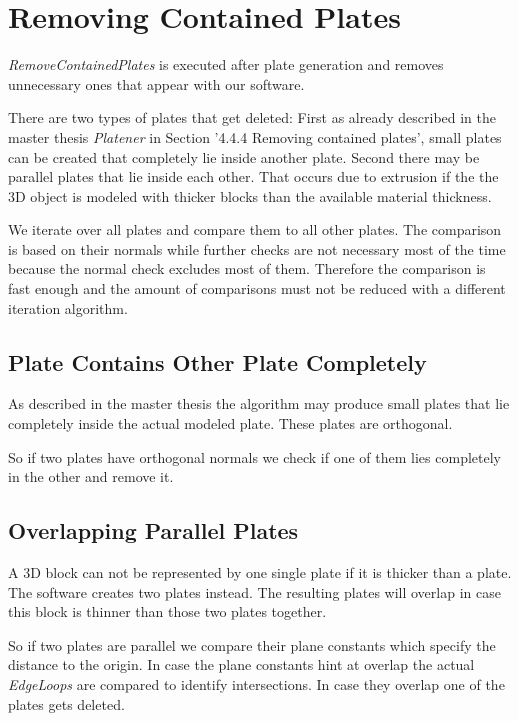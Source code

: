 \documentclass[../ClassicThesis.tex]{subfiles}
\begin{document}
\section{Removing Contained Plates}\label{sec:removingContainedPlates}

\emph{RemoveContainedPlates} is executed after plate generation and removes unnecessary ones that appear with our software.

There are two types of plates that get deleted: First as already described in the master thesis \emph{Platener} \cite{master-thesis} in Section '4.4.4 Removing contained plates', small plates can be created that completely lie inside another plate. Second there may be parallel plates that lie inside each other. That occurs due to extrusion if the the 3D object is modeled with thicker blocks than the available material thickness.

We iterate over all plates and compare them to all other plates. The comparison is based on their normals while further checks are not necessary most of the time because the normal check excludes most of them. Therefore the comparison is fast enough and the amount of comparisons must not be reduced with a different iteration algorithm.

\subsection{Plate Contains Other Plate Completely}

As described in the master thesis the algorithm may produce small plates that lie completely inside the actual modeled plate. These plates are orthogonal.

So if two plates have orthogonal normals we check if one of them lies completely in the other and remove it.


\subsection{Overlapping Parallel Plates}

A 3D block can not be represented by one single plate if it is thicker than a plate. The software creates two plates instead. The resulting plates will overlap in case this block is thinner than those two plates together.

So if two plates are parallel we compare their plane constants which specify the distance to the origin. In case the plane constants hint at overlap the actual \emph{EdgeLoops} are compared to identify intersections. In case they overlap one of the plates gets deleted.
\end{document}
